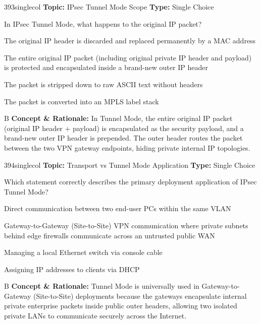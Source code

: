 \begin{qcard}{393}{singlecol}
\textcolor{darkslate!75}{\small\textbf{Topic:} IPsec Tunnel Mode Scope \hfill \textbf{Type:} Single Choice}\vspace{0.4em}\par
In IPsec Tunnel Mode, what happens to the original IP packet?
\begin{qoptions}
\item The original IP header is discarded and replaced permanently by a MAC address
\item The entire original IP packet (including original private IP header and payload) is protected and encapsulated inside a brand-new outer IP header
\item The packet is stripped down to raw ASCII text without headers
\item The packet is converted into an MPLS label stack
\end{qoptions}
\end{qcard}
\nopagebreak
\begin{explainbox}{B}
\textbf{Concept \& Rationale:} In Tunnel Mode, the entire original IP packet (original IP header + payload) is encapsulated as the security payload, and a brand-new outer IP header is prepended. The outer header routes the packet between the two VPN gateway endpoints, hiding private internal IP topologies.
\end{explainbox}

\begin{qcard}{394}{singlecol}
\textcolor{darkslate!75}{\small\textbf{Topic:} Transport vs Tunnel Mode Application \hfill \textbf{Type:} Single Choice}\vspace{0.4em}\par
Which statement correctly describes the primary deployment application of IPsec Tunnel Mode?
\begin{qoptions}
\item Direct communication between two end-user PCs within the same VLAN
\item Gateway-to-Gateway (Site-to-Site) VPN communication where private subnets behind edge firewalls communicate across an untrusted public WAN
\item Managing a local Ethernet switch via console cable
\item Assigning IP addresses to clients via DHCP
\end{qoptions}
\end{qcard}
\nopagebreak
\begin{explainbox}{B}
\textbf{Concept \& Rationale:} Tunnel Mode is universally used in Gateway-to-Gateway (Site-to-Site) deployments because the gateways encapsulate internal private enterprise packets inside public outer headers, allowing two isolated private LANs to communicate securely across the Internet.
\end{explainbox}

